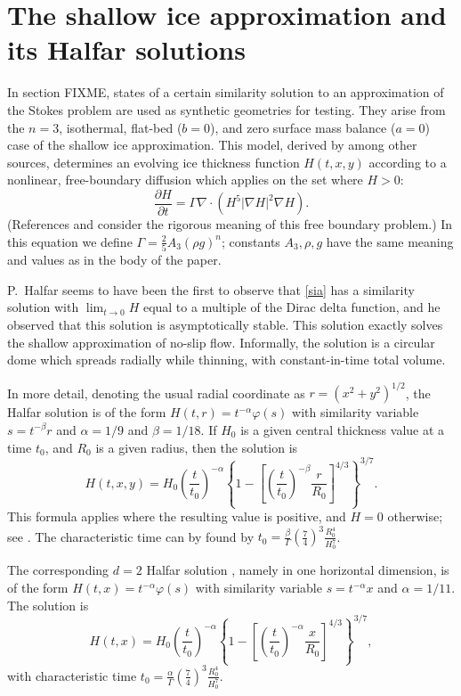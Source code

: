 \documentclass[letterpaper,final,12pt,reqno]{amsart}
\newcommand{\grad}{\nabla}
\newcommand{\Div}{\nabla\cdot}
\begin{document}
\appendix
\section{The shallow ice approximation and its Halfar solutions}

In section FIXME, states of a certain similarity solution to an approximation of the Stokes problem are used as synthetic geometries for testing.  They arise from the $n=3$, isothermal, flat-bed ($b=0$), and zero surface mass balance ($a=0$) case of the shallow ice approximation.  This model, derived by \cite{GreveBlatter2009} among other sources, determines an evolving ice thickness function $H(t,x,y)$ according to a nonlinear, free-boundary diffusion which applies on the set where $H>0$:
\begin{equation}
\frac{\partial H}{\partial t} = \Gamma \Div \left(H^5 |\grad H|^2 \grad H\right). \label{sia}
\end{equation}
(References \cite{Bueler2016} and \cite{JouvetBueler2012} consider the rigorous meaning of this free boundary problem.)  In this equation we define $\Gamma = \frac{2}{5} A_3 (\rho g)^n$; constants $A_3,\rho,g$ have the same meaning and values as in the body of the paper.

P.~Halfar \cite{Halfar1981,Halfar1983} seems to have been the first to observe that \eqref{sia} has a similarity solution with $\lim_{t\to 0} H$ equal to a multiple of the Dirac delta function, and he observed that this solution is asymptotically stable.  This solution exactly solves the shallow approximation of no-slip flow.  Informally, the solution is a circular dome which spreads radially while thinning, with constant-in-time total volume.

In more detail, denoting the usual radial coordinate as $r=(x^2+y^2)^{1/2}$, the Halfar solution \cite{Halfar1983} is of the form $H(t,r) = t^{-\alpha} \varphi(s)$ with similarity variable $s=t^{-\beta} r$ and $\alpha=1/9$ and $\beta=1/18$.  If $H_0$ is a given central thickness value at a time $t_0$, and $R_0$ is a given radius, then the solution is
    $$H(t,x,y) = H_0 \left(\frac{t}{t_0}\right)^{-\alpha} \left\{1 - \left[\left(\frac{t}{t_0}\right)^{-\beta} \frac{r}{R_0}\right]^{4/3}\right\}^{3/7}.$$
This formula applies where the resulting value is positive, and $H=0$ otherwise; see \cite{Bueleretal2005}.  The characteristic time can by found by $\displaystyle t_0 = \frac{\beta}{\Gamma} \left(\frac{7}{4}\right)^3 \frac{R_0^4}{H_0^7}$.

The corresponding $d=2$ Halfar solution \cite{Halfar1981}, namely in one horizontal dimension, is of the form $H(t,x) = t^{-\alpha} \varphi(s)$ with similarity variable $s=t^{-\alpha} x$ and $\alpha=1/11$.  The solution is
    $$H(t,x) = H_0 \left(\frac{t}{t_0}\right)^{-\alpha} \left\{1 - \left[\left(\frac{t}{t_0}\right)^{-\alpha} \frac{x}{R_0}\right]^{4/3}\right\}^{3/7},$$
with characteristic time $\displaystyle t_0 = \frac{\alpha}{\Gamma} \left(\frac{7}{4}\right)^3 \frac{R_0^4}{H_0^7}$.

\small

\bigskip


\end{document}
